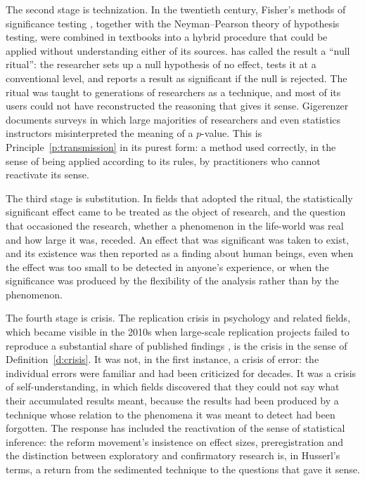\documentclass{situationist-preprint}
\begin{document}
The second stage is technization. In the twentieth century, Fisher's methods of significance testing \citep{Fisher1925}, together with the Neyman--Pearson theory of hypothesis testing, were combined in textbooks into a hybrid procedure that could be applied without understanding either of its sources. \citet{Gigerenzer2004} has called the result a \enquote{null ritual}: the researcher sets up a null hypothesis of no effect, tests it at a conventional level, and reports a result as significant if the null is rejected. The ritual was taught to generations of researchers as a technique, and most of its users could not have reconstructed the reasoning that gives it sense. Gigerenzer documents surveys in which large majorities of researchers and even statistics instructors misinterpreted the meaning of a $p$-value. This is Principle~\ref{p:transmission} in its purest form: a method used correctly, in the sense of being applied according to its rules, by practitioners who cannot reactivate its sense.

The third stage is substitution. In fields that adopted the ritual, the statistically significant effect came to be treated as the object of research, and the question that occasioned the research, whether a phenomenon in the life-world was real and how large it was, receded. An effect that was significant was taken to exist, and its existence was then reported as a finding about human beings, even when the effect was too small to be detected in anyone's experience, or when the significance was produced by the flexibility of the analysis rather than by the phenomenon.

The fourth stage is crisis. The replication crisis in psychology and related fields, which became visible in the 2010s when large-scale replication projects failed to reproduce a substantial share of published findings \citep{OSC2015}, is the crisis in the sense of Definition~\ref{d:crisis}. It was not, in the first instance, a crisis of error: the individual errors were familiar and had been criticized for decades. It was a crisis of self-understanding, in which fields discovered that they could not say what their accumulated results meant, because the results had been produced by a technique whose relation to the phenomena it was meant to detect had been forgotten. The response has included the reactivation of the sense of statistical inference: the reform movement's insistence on effect sizes, preregistration and the distinction between exploratory and confirmatory research is, in Husserl's terms, a return from the sedimented technique to the questions that gave it sense.
\end{document}
